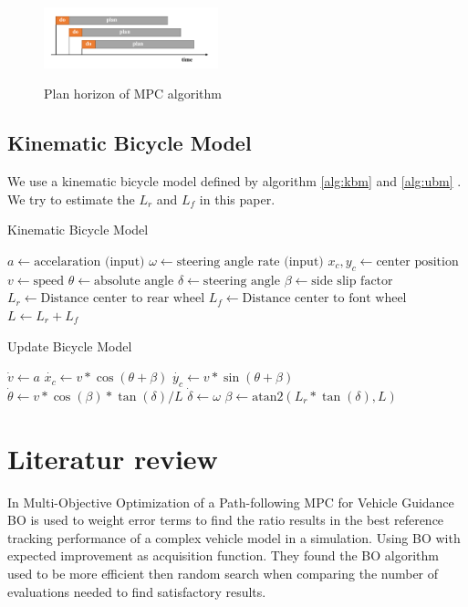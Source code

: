 \documentclass[twoside,twocolumn]{article}
\begin{document}
\begin{figure}[h]
    \caption{Plan horizon of MPC algorithm}
    \centering
    \includegraphics[width=0.45\textwidth]{fig_mpc_plan.pdf}
    \label{fig:mpc_plan}
\end{figure}

\subsection{Kinematic Bicycle Model}

We use a kinematic bicycle model defined by algorithm \ref{alg:kbm} and \ref{alg:ubm} \cite{kinematicBicycleModel}. We try to estimate the $L_r$ and $L_f$ in this paper.
\begin{algorithm}
    \caption{Kinematic Bicycle Model}
    \label{alg:kbm}
    \begin{algorithmic}
        \State $a \gets \text{accelaration (input)}$
        \State $\omega \gets \text{steering angle rate (input)}$
        \State $x_c, y_c \gets \text{center position}$
        \State $v \gets \text{speed}$
        \State $\theta \gets \text{absolute angle}$
        \State $\delta \gets \text{steering angle}$
        \State $\beta \gets \text{side slip factor}$
        \State $L_r \gets \text{Distance center to rear wheel}$
        \State $L_f \gets \text{Distance center to font wheel}$
        \State $L \gets L_r + L_f$
    \end{algorithmic}
\end{algorithm}

\begin{algorithm}
    \caption{Update Bicycle Model}
    \label{alg:ubm}
    \begin{algorithmic}
        \State $\dot{v} \gets a$
        \State $\dot{x_c} \gets v * \cos{(\theta + \beta)}$
        \State $\dot{y_c} \gets v * \sin{(\theta + \beta)}$
        \State $\dot{\theta} \gets v * \cos{(\beta)} * \tan{(\delta)} / L$
        \State $\dot{\delta} \gets \omega$
        \State $\beta \gets \text{atan2}(L_r * \tan{(\delta)}, L)$
    \end{algorithmic}
\end{algorithm}

\section{Literatur review}
In Multi-Objective Optimization of a Path-following MPC for Vehicle Guidance \cite{gharib2021multi} BO is used to weight error terms to find the ratio results in the best reference tracking performance of a complex vehicle model in a simulation. Using BO with expected improvement as acquisition function. They found the BO algorithm used to be more efficient then random search when comparing the number of evaluations needed to find satisfactory results.
\end{document}
